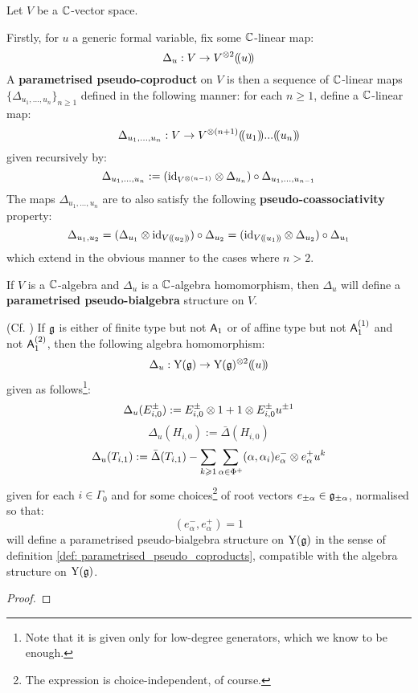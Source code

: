             
        
            \begin{definition} \label{def: parametrised_pseudo_coproducts}
                Let $V$ be a $\mathbb{C}$-vector space. 

                Firstly, for $u$ a generic formal variable, fix some $\mathbb{C}$-linear map:
                    $$\Delta_u: V \to V^{\tensor 2}(\!(u)\!)$$
                A \textbf{parametrised pseudo-coproduct} on $V$ is then a sequence of $\mathbb{C}$-linear maps $\{\Delta_{u_1, ..., u_n}\}_{n \geq 1}$ defined in the following manner: for each $n \geq 1$, define a $\mathbb{C}$-linear map:
                    $$\Delta_{u_1, ..., u_n}: V \to V^{\tensor (n + 1)}(\!(u_1)\!) ... (\!(u_n)\!)$$
                given recursively by:
                    $$\Delta_{u_1, ..., u_n} := ( \id_{ V^{\tensor (n - 1)} } \tensor \Delta_{u_n} ) \circ \Delta_{u_1, ..., u_{n - 1}}$$
                The maps $\Delta_{u_1, ..., u_n}$ are to also satisfy the following \textbf{pseudo-coassociativity} property:
                    $$\Delta_{u_1, u_2} = ( \Delta_{u_1} \tensor \id_{V(\!(u_2)\!)} ) \circ \Delta_{u_2} = ( \id_{V(\!(u_1)\!)} \tensor \Delta_{u_2} ) \circ \Delta_{u_1}$$
                which extend in the obvious manner to the cases where $n > 2$. 

                If $V$ is a $\mathbb{C}$-algebra and $\Delta_u$ is a $\mathbb{C}$-algebra homomorphism, then $\Delta_u$ will define a \textbf{parametrised pseudo-bialgebra} structure on $V$.
            \end{definition}
            \begin{theorem} \label{theorem: parametrised_pseudo_coproduct_on_yangians}
                (Cf. \cite[Theorem 6.2]{guay_nakajima_wendlandt_affine_yangian_coproduct}) If $\mathfrak{g}$ is either of finite type but not $\mathsf{A}_1$ or of affine type but not $\mathsf{A}_1^{(1)}$ and not $\mathsf{A}_1^{(2)}$, then the following algebra homomorphism:
                    $$\Delta_u: \rmY(\g) \to \rmY(\g)^{\tensor 2}(\!(u)\!)$$
                given as follows\footnote{Note that it is given only for low-degree generators, which we know to be enough.}:
                    $$\Delta_u(E_{i, 0}^{\pm}) := E_{i, 0}^{\pm} \tensor 1 + 1 \tensor E_{i, 0}^{\pm} u^{\pm 1}$$
                    $$\Delta_u(H_{i, 0}) := \bar{\Delta}(H_{i, 0})$$
                    $$\Delta_u(T_{i, 1}) := \bar{\Delta}(T_{i, 1}) - \sum_{k \geq 1} \sum_{\alpha \in \Phi^+} (\alpha, \alpha_i) e_{\alpha}^- \tensor e_{\alpha}^+ u^k$$
                given for each $i \in \Gamma_0$ and for some choices\footnote{The expression is choice-independent, of course.} of root vectors $e_{\pm\alpha} \in \mathfrak{g}_{\pm\alpha}$, normalised so that:
                    $$(e_{\alpha}^-, e_{\alpha}^+) = 1$$
                will define a parametrised pseudo-bialgebra structure on $\mathrm{Y}(\mathfrak{g})$ in the sense of definition \ref{def: parametrised_pseudo_coproducts}, compatible with the algebra structure on $\mathrm{Y}(\mathfrak{g})$.
            \end{theorem}
                \begin{proof}
                    
                \end{proof}

